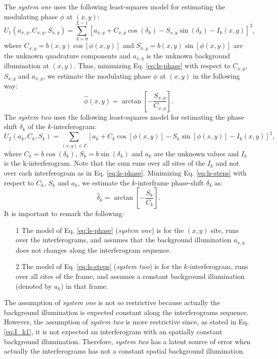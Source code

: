 \documentclass[letterpaper,12pt]{article}   %
\begin{document}
The \emph{system one} uses the following least-squares model for
estimating the modulating phase $\phi$ at $(x,y)$:
\begin{equation}
  U_1(a_{x,y},C_{x,y},S_{x,y}) = \sum_{k=0}^{L-1}\left[
    a_{x,y}+C_{x,y}\cos(\delta_k)-S_{x,y}\sin(\delta_k)-I_k(x,y)
  \right]^2, \label{eq:ls-phase}
\end{equation} 
where $C_{x,y}=b(x,y)\cos[\phi(x,y)]$ and
$S_{x,y}=b(x,y)\sin[\phi(x,y)]$ are the unknown quadrature components
and $a_{x,y}$ is the unknown background illumination at $(x,y)$. Thus,
minimizing Eq. \eqref{eq:ls-phase} with respect to $C_{x,y}$,
$S_{x,y}$ and $a_{x,y}$, we estimate the modulating phase $\phi$ at
$(x,y)$ in the following way:
\begin{equation}
  \hat\phi(x,y) = \arctan\left[-\frac{S_{x,y}}{C_{x,y}}\right].
\end{equation}
The \emph{system two} uses the following least-squares model for
estimating the phase shift $\delta_k$ of the $k$-interferogram:
\begin{equation}
  U_2(a_k,C_k,S_k) = \sum_{(x,y)\in \Gamma}\left[
    a_k+C_k\cos[\phi(x,y)]-S_k\sin[\phi(x,y)]-I_k(x,y)
  \right]^2, \label{eq:ls-steps}
\end{equation} 
where $C_k=b\cos(\delta_k)$, $S_k=b\sin(\delta_k)$ and $a_k$ are the
unknown values and $I_k$ is the k-interferogram. Note that the sum
runs over all sites of the $I_k$ and not over each interferogram as in
Eq. \eqref{eq:ls-phase}. Minimizing Eq. \eqref{eq:ls-steps} with
respect to $C_k$, $S_k$ and $a_k$, we estimate the $k$-interframe
phase-shift $\delta_k$ as:
\begin{equation}
  \hat\delta_k = \arctan\left[-\frac{S_k}{C_k}\right].
\end{equation}
It is important to remark the following:
\begin{itemize}
\item[1] The model of Eq. \eqref{eq:ls-phase} (\emph{system one}) is
  for the $(x,y)$ site, runs over the interferograms, and assumes that
  the background illumination $a_{x,y}$ does not changes along the
  interferogram sequence.
\item[2] The model of Eq. \eqref{eq:ls-steps} (\emph{system two}) is
  for the $k$-interferogram, runs over all sites of the frame, and
  assumes a constant background illumination (denoted by $a_k$) in
  that frame.
\end{itemize}
The assumption of \emph{system one} is not so restrictive because
actually the background illumination is expected constant along the
interferograms sequence. However, the assumption of \emph{system two}
is more restrictive since, as stated in Eq. \eqref{eq:I_k1}, it is not
expected an interferogram with an spatially constant background
illumination. Therefore, \emph{system two} has a latent source of
error when actually the interferograms has not a constant spatial
background illumination.
\end{document}
